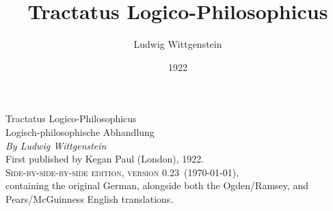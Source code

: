 \documentclass[oneside,openany,12pt]{book}
\title{Tractatus Logico-Philosophicus}
\author{Ludwig Wittgenstein}
\date{1922}
\newcommand{\version}{0.23}
\begin{document}
\sloppy
\begin{titlepage}
\begin{center}
\vspace*{2in}
{\Huge Tractatus Logico-Philosophicus}\\[20.0pt]
{\LARGE Logisch-philosophische Abhandlung}\\[30.0pt]
{\Large \textit{By Ludwig Wittgenstein}}\\[90.0pt]
{First published by Kegan Paul (London), 1922.}\\[20.0pt]
{\textsc{Side-by-side-by-side edition, version \version\ (\today),}}\\
{containing the original German, alongside both the
Ogden/Ramsey, and Pears/McGuinness English translations.}
\end{center}
\end{titlepage}
\setlength{\parskip}{0pt}
\end{document}
